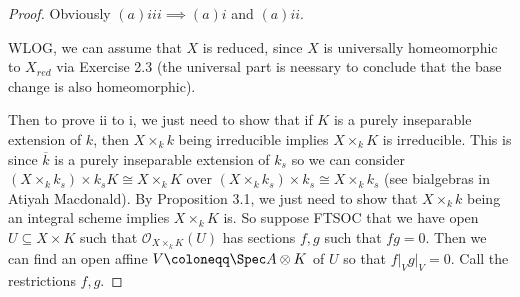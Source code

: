 \begin{proof}
	Obviously $(a)iii \implies (a)i $ and $(a)ii $.

	WLOG, we can assume that $X $ is reduced, since $X $ is universally homeomorphic to $X_{red} $ via Exercise 2.3 (the universal part is neessary to conclude that the base change is also homeomorphic).

	Then to prove ii to i, we just need to show that if $K $ is a purely inseparable extension of $k $, then $X \times _k k $ being irreducible implies $X \times _k K $ is irreducible.
	This is since $\overline{k}  $ is a purely inseparable extension of $k_s $ so we can consider $(X \times _k k_s) \times k_s K \cong X \times _k K$ over $(X \times _k k_s) \times k_s\cong X \times _k k_s $ (see bialgebras in Atiyah Macdonald).
	By Proposition 3.1, we just need to show that $X \times _k k $ being an integral scheme implies $X \times _k K $ is.
	So suppose FTSOC that we have open $U \subseteq X \times K $ such that $\mathcal{O}_{X \times _k K} (U) $ has sections $f,g $ such that $fg = 0 $.
	Then we can find an open affine $V \coloneqq \Spec A \otimes K $ of $U $ so that $f\left.\right|_{V}g\left.\right|_{V} = 0 $.
	Call the restrictions $f,g $.


\end{proof}

